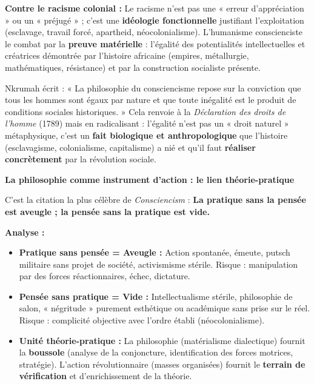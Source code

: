 \documentclass[11pt]{article}
\begin{document}
\textbf{Contre le racisme colonial :} Le racisme n'est pas une « erreur d'appréciation » ou un « préjugé » ; c'est une \textbf{idéologie fonctionnelle} justifiant l'exploitation (esclavage, travail forcé, apartheid, néocolonialisme). L'humanisme conscienciste le combat par la \textbf{preuve matérielle} : l'égalité des potentialités intellectuelles et créatrices démontrée par l'histoire africaine (empires, métallurgie, mathématiques, résistance) et par la construction socialiste présente.

\begin{savaistu}
Nkrumah écrit : « La philosophie du consciencisme repose sur la conviction que tous les hommes sont égaux par nature et que toute inégalité est le produit de conditions sociales historiques. » Cela renvoie à la \emph{Déclaration des droits de l'homme} (1789) mais en radicalisant : l'égalité n'est pas un « droit naturel » métaphysique, c'est un \textbf{fait biologique et anthropologique} que l'histoire (esclavagisme, colonialisme, capitalisme) a nié et qu'il faut \textbf{réaliser concrètement} par la révolution sociale.
\end{savaistu}

\textbf{La philosophie comme instrument d'action : le lien théorie-pratique}\par

C'est la citation la plus célèbre de \emph{Consciencism} : \og \textbf{La pratique sans la pensée est aveugle ; la pensée sans la pratique est vide.} \fg

\textbf{Analyse :}\par
\begin{itemize}
    \item \textbf{Pratique sans pensée = Aveugle :} Action spontanée, émeute, putsch militaire sans projet de société, activismisme stérile. Risque : manipulation par des forces réactionnaires, échec, dictature.
    \item \textbf{Pensée sans pratique = Vide :} Intellectualisme stérile, philosophie de salon, « négritude » purement esthétique ou académique sans prise sur le réel. Risque : complicité objective avec l'ordre établi (néocolonialisme).
    \item \textbf{Unité théorie-pratique :} La philosophie (matérialisme dialectique) fournit la \textbf{boussole} (analyse de la conjoncture, identification des forces motrices, stratégie). L'action révolutionnaire (masses organisées) fournit le \textbf{terrain de vérification} et d'enrichissement de la théorie.
\end{itemize}
\end{document}
